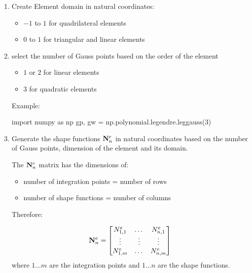 \begin{enumerate}
    \item Create Element domain in natural coordinates:
        \begin{itemize}
            \item $ -1 $ to $ 1 $ for quadrilateral elements
            \item $ 0 $ to $ 1 $ for triangular and linear elements
        \end{itemize}

    \item select the number of Gauss points based on the order of the element
        \begin{itemize}
            \item $ 1 $ or $ 2 $ for linear elements
            \item $ 3 $ for quadratic elements
        \end{itemize}

        Example:
        \begin{python}
import numpy as np
gp, gw = np.polynomial.legendre.leggauss(3)
        \end{python}

    \item Generate the shape functions $ \mathbf{N}_n^e $ in natural coordinates
        based on the number of Gauss points, dimension of the element and its domain.

        The $ \mathbf{N}_n^e $ matrix has the dimensions of:
        \begin{itemize}
            \item number of integration points = number of rows
            \item number of shape functions = number of columns
        \end{itemize}

        Therefore:

        \begin{equation}
            \mathbf{N}_n^e = \begin{bmatrix}
                N_{1,1}^e & \dots & N_{n,1}^e\\
                \vdots & \vdots & \vdots\\
                N_{1,m}^e & \dots & N_{n,m}^e
            \end{bmatrix}
        \end{equation}
         where $ 1 \dots m $ are the integration points and $ 1 \dots n $ are the shape
         functions.


\end{enumerate}

